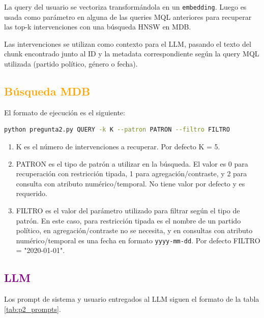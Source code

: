 \documentclass{article}
\begin{document}
La query del usuario se vectoriza transformándola en un \texttt{embedding}. Luego es usada como parámetro en alguna de las queries MQL anteriores para recuperar las top-k intervenciones con una búsqueda HNSW en MDB.

Las intervenciones se utilizan como contexto para el LLM, pasando el texto del chunk encontrado junto al ID y la metadata correspondiente según la query MQL utilizada (partido político, género o fecha).

\subsection*{\textcolor{orange}{Búsqueda MDB}}

El formato de ejecución es el siguiente: 
\begin{lstlisting}[language=Bash]
python pregunta2.py QUERY -k K --patron PATRON --filtro FILTRO
\end{lstlisting}

\begin{enumerate}
    \item K es el número de intervenciones a recuperar. Por defecto K = 5.
    \item PATRON es el tipo de patrón a utilizar en la búsqueda. El valor es 0 para recuperación con restricción tipada, 1 para agregación/contraste, y 2 para consulta con atributo numérico/temporal. No tiene valor por defecto y es requerido.
    \item FILTRO es el valor del parámetro utilizado para filtrar según el tipo de patrón. En este caso, para restricción tipada es el nombre de un partido político, en agregación/contraste no se necesita, y en consultas con atributo numérico/temporal es una fecha en formato \texttt{yyyy-mm-dd}. Por defecto FILTRO = "2020-01-01".
\end{enumerate}


\subsection*{\textcolor{purple}{LLM}}

Los prompt de sistema y usuario entregados al LLM siguen el formato de la tabla \ref{tab:p2_prompts}.
\end{document}
